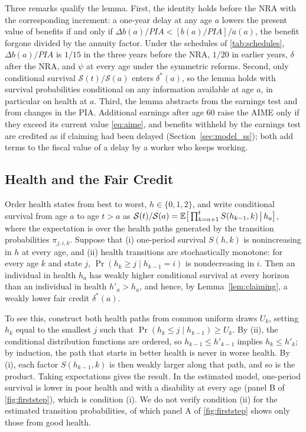 Three remarks qualify the lemma. First, the identity holds before the NRA with the corresponding increment: a one-year delay at any age $a$ lowers the present value of benefits if and only if $\Delta b(a)/\mathit{PIA}<[b(a)/\mathit{PIA}]/\ddot a(a)$, the benefit forgone divided by the annuity factor. Under the schedules of \autoref{tab:schedules}, $\Delta b(a)/\mathit{PIA}$ is $1/15$ in the three years before the NRA, $1/20$ in earlier years, $\delta$ after the NRA, and $\psi$ at every age under the symmetric reforms. Second, only conditional survival $\mathcal{S}(t)/\mathcal{S}(a)$ enters $\delta^{*}(a)$, so the lemma holds with survival probabilities conditional on any information available at age $a$, in particular on health at $a$. Third, the lemma abstracts from the earnings test and from changes in the PIA. Additional earnings after age 60 raise the AIME only if they exceed its current value \eqref{eq:aime}, and benefits withheld by the earnings test are credited as if claiming had been delayed (Section~\ref{sec:model_ss}); both add terms to the fiscal value of a delay by a worker who keeps working.

\subsection{Health and the Fair Credit}

Order health states from best to worst, $h\in\{0,1,2\}$, and write conditional survival from age $a$ to age $t>a$ as $\mathcal{S}(t)/\mathcal{S}(a)=\mathbb{E}\big[\prod_{k=a+1}^{t}S(h_{k-1},k)\,\big|\,h_a\big]$, where the expectation is over the health paths generated by the transition probabilities $\pi_{j,i,k}$. Suppose that (i) one-period survival $S(h,k)$ is nonincreasing in $h$ at every age, and (ii) health transitions are stochastically monotone: for every age $k$ and state $j$, $\Pr(h_{k}\geq j\mid h_{k-1}=i)$ is nondecreasing in $i$. Then an individual in health $h_a$ has weakly higher conditional survival at every horizon than an individual in health $h'_a>h_a$, and hence, by Lemma~\ref{lem:claiming}, a weakly lower fair credit $\delta^{*}(a)$.

To see this, construct both health paths from common uniform draws $U_k$, setting $h_k$ equal to the smallest $j$ such that $\Pr(h_k\leq j\mid h_{k-1})\geq U_k$. By (ii), the conditional distribution functions are ordered, so $h_{k-1}\leq h'_{k-1}$ implies $h_k\leq h'_k$; by induction, the path that starts in better health is never in worse health. By (i), each factor $S(h_{k-1},k)$ is then weakly larger along that path, and so is the product. Taking expectations gives the result. In the estimated model, one-period survival is lower in poor health and with a disability at every age (panel B of \autoref{fig:firststep}), which is condition (i). We do not verify condition (ii) for the estimated transition probabilities, of which panel A of \autoref{fig:firststep} shows only those from good health. %

